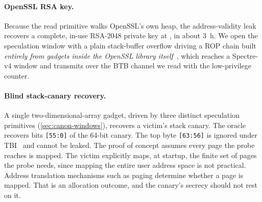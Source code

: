 \paragraph{OpenSSL RSA key.}
Because the read primitive walks OpenSSL's own heap, the address-validity leak recovers a complete,
in-use RSA-2048 private key at , in about $3$~h. We open the speculation window
with a plain stack-buffer overflow driving a ROP chain built \emph{entirely from gadgets inside the
OpenSSL library itself}~\cite{riscyrop}, which reaches a Spectre-v4 window and transmits over the BTB
channel we read with the low-privilege  counter.

\paragraph{Blind stack-canary recovery.}
A single two-dimensional-array gadget, driven by three distinct speculation primitives
(\autoref{sec:canon-windows}), recovers a victim's stack canary. The oracle recovers bits
\texttt{[55:0]} of the 64-bit canary. The top byte \texttt{[63:56]} is ignored under
TBI~\cite{arm_tbi} and cannot be leaked. The proof of concept assumes every page the probe reaches
is mapped. The victim explicitly maps, at startup, the finite set of pages the probe needs, since
mapping the entire user address space is not practical. Address translation mechanisms such as
paging determine whether a page is mapped. That is an allocation outcome, and the canary's secrecy
should not rest on it.
